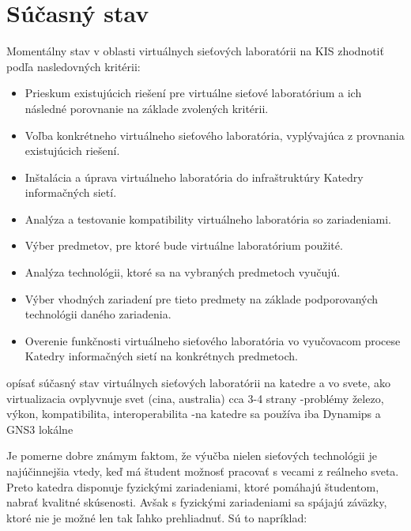 \chapter{Súčasný stav}

Momentálny stav v oblasti virtuálnych sieťových laboratórii na KIS zhodnotiť podľa nasledovných kritérii:

\begin{itemize}
    \item Prieskum existujúcich riešení pre virtuálne sieťové laboratórium a ich následné porovnanie na základe zvolených kritérii.
    \item Voľba konkrétneho virtuálneho sieťového laboratória, vyplývajúca z provnania existujúcich riešení.
    \item Inštalácia a úprava virtuálneho laboratória do infraštruktúry Katedry informačných sietí.
    \item Analýza a testovanie kompatibility virtuálneho laboratória so zariadeniami.
    \item Výber predmetov, pre ktoré bude virtuálne laboratórium použité.
    \item Analýza technológii, ktoré sa na vybraných predmetoch vyučujú.
    \item Výber vhodných zariadení pre tieto predmety na základe podporovaných technológii daného zariadenia.
    \item Overenie funkčnosti virtuálneho sieťového laboratória vo vyučovacom procese Katedry informačných sietí na konkrétnych predmetoch.
\end{itemize}

opísať súčasný stav virtuálnych sieťových laboratórii na katedre a vo svete, ako virtualizacia ovplyvnuje svet (cina, australia) cca 3-4 strany
    -problémy železo, výkon, kompatibilita, interoperabilita
    -na katedre sa používa iba Dynamips a GNS3 lokálne

Je pomerne dobre známym faktom, že výučba nielen sieťových technológii je najúčinnejšia vtedy, keď má študent možnosť pracovať s vecami z reálneho sveta. Preto katedra disponuje fyzickými zariadeniami, ktoré pomáhajú študentom, nabrať kvalitné skúsenosti. Avšak s fyzickými zariadeniami sa spájajú záväzky, ktoré nie je možné len tak ľahko prehliadnuť. Sú to napríklad:

